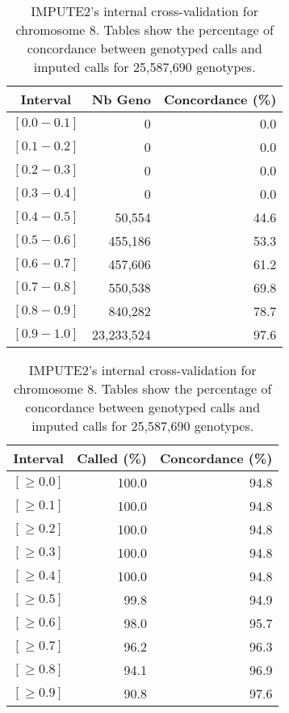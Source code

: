 \documentclass[10pt,twoside,english]{scrartcl}
\begin{document}
\begin{table}[H]
\protect\caption{IMPUTE2's internal cross-validation for chromosome 8. Tables show the
percentage of concordance between genotyped calls and imputed calls
for 25,587,690 genotypes.\label{tab:cross_validation_chr_8}}

\centering

\begin{tabular}{crr}
\hline 
\multicolumn{1}{c}{\textbf{Interval}}
 & \multicolumn{1}{c}{\textbf{Nb Geno}}
 & \multicolumn{1}{c}{\textbf{Concordance (\%)}}
\\
\hline 

$[0.0-0.1]$ & 0 & 0.0\\
$[0.1-0.2]$ & 0 & 0.0\\
$[0.2-0.3]$ & 0 & 0.0\\
$[0.3-0.4]$ & 0 & 0.0\\
$[0.4-0.5]$ & 50,554 & 44.6\\
$[0.5-0.6]$ & 455,186 & 53.3\\
$[0.6-0.7]$ & 457,606 & 61.2\\
$[0.7-0.8]$ & 550,538 & 69.8\\
$[0.8-0.9]$ & 840,282 & 78.7\\
$[0.9-1.0]$ & 23,233,524 & 97.6\\
\hline 
\end{tabular}
\hfill
\begin{tabular}{crr}
\hline 
\multicolumn{1}{c}{\textbf{Interval}}
 & \multicolumn{1}{c}{\textbf{Called (\%)}}
 & \multicolumn{1}{c}{\textbf{Concordance (\%)}}
\\
\hline 

$[\geq 0.0]$ & 100.0 & 94.8\\
$[\geq 0.1]$ & 100.0 & 94.8\\
$[\geq 0.2]$ & 100.0 & 94.8\\
$[\geq 0.3]$ & 100.0 & 94.8\\
$[\geq 0.4]$ & 100.0 & 94.8\\
$[\geq 0.5]$ & 99.8 & 94.9\\
$[\geq 0.6]$ & 98.0 & 95.7\\
$[\geq 0.7]$ & 96.2 & 96.3\\
$[\geq 0.8]$ & 94.1 & 96.9\\
$[\geq 0.9]$ & 90.8 & 97.6\\
\hline 
\end{tabular}


\end{table}
\end{document}
